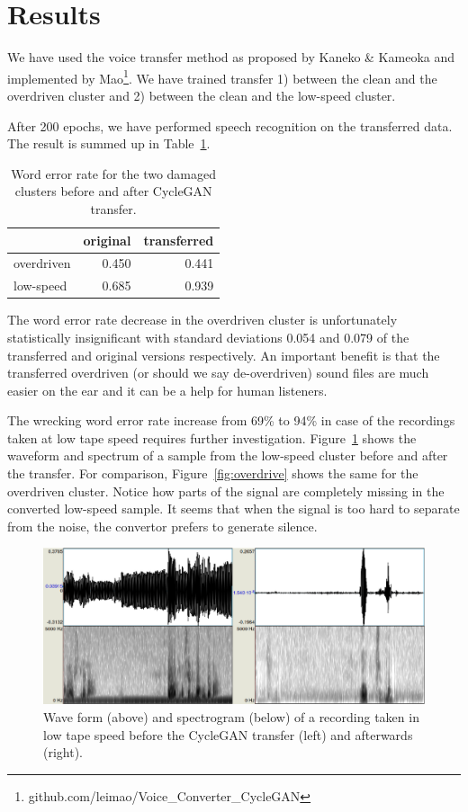 \documentclass[runningheads]{llncs}
\begin{document}
\section{Results}

We have used the voice transfer method as proposed by Kaneko \&
Kameoka\cite{kaneko2017parallel} and implemented by
Mao\footnote{github.com/leimao/Voice\_Converter\_CycleGAN}. We have trained
transfer 1) between the clean and the overdriven cluster and 2) between the
clean and the low-speed cluster.

After 200 epochs, we have performed speech recognition on the transferred data.
The result is summed up in Table~\ref{tab:results}.

\begin{table}[htpb]
\begin{center}
\begin{tabular}{|l||r|r|}
\hline
           & original & transferred \\
\hline
overdriven & 0.450 & 0.441 \\
low-speed  & 0.685 & 0.939 \\
\hline
\end{tabular}
\caption{Word error rate for the two damaged clusters before and after CycleGAN
transfer.}\label{tab:results}
\end{center}
\end{table}

The word error rate decrease in the overdriven cluster is unfortunately statistically
insignificant with standard deviations 0.054 and 0.079 of the transferred and
original versions respectively. An important benefit is
that the transferred overdriven (or should we say de-overdriven) sound files are
much easier on the ear and it can be a help for human listeners.

The wrecking word error rate increase from 69\% to 94\% in case of the
recordings taken at low tape speed requires further investigation.
Figure~\ref{fig:plzen} shows the waveform and spectrum of a sample from the low-speed
cluster before and after the transfer. For comparison,
Figure~\ref{fig:overdrive} shows the same for the overdriven cluster.
Notice how parts of the signal are completely missing in the converted low-speed
sample. It seems that when the signal is too hard to separate from the noise,
the convertor prefers to generate silence.

\begin{figure}[htpb]
\includegraphics[scale=0.4]{rc/plzen.eps}
\caption{Wave form (above) and spectrogram (below) of a recording taken in low
tape speed before the CycleGAN transfer (left) and afterwards (right).}
\label{fig:plzen}
\end{figure}
\end{document}

